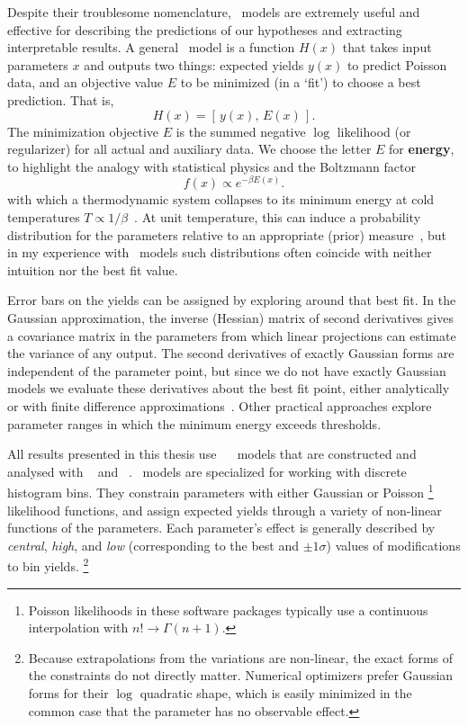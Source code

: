 Despite their troublesome nomenclature, \heplikelihood\ models are extremely
useful and effective for describing the predictions of our hypotheses and
extracting interpretable results.
A general \heplikelihood\ model is a function $H(x)$ that takes input
parameters $x$ and outputs two things:
expected yields $y(x)$ to predict Poisson data,
and an objective value $E$ to be minimized (in a `fit') to choose a best
prediction.
That is,
\begin{equation}
H(x) = [\,y(x), \,E(x)\,]
.
\end{equation}
The minimization objective $E$ is the summed negative $\log$ likelihood
(or regularizer) for all actual and auxiliary data.
We choose the letter $E$ for \textbf{energy}, to highlight the analogy with
statistical physics and the Boltzmann factor
\begin{equation}
f(x) \propto e^{-\beta E(x)}
.
\end{equation}
with which a thermodynamic system collapses to its minimum energy at cold
temperatures $T \propto 1/\beta$~\cite{
skilling2017david,
lecun-06,
pmlr-v2-ranzato07a
}.
At unit temperature, this can induce a probability distribution
for the parameters relative to an appropriate (prior)
measure~\cite{cranmer2012histfactory, skilling2017david},
but in my experience with \heplikelihood\ models such distributions often
coincide with neither intuition nor the best fit value.

Error bars on the yields can be assigned by exploring around that best fit.
In the Gaussian approximation, the inverse (Hessian) matrix of second
derivatives gives a covariance matrix in the parameters from which linear
projections can estimate the variance of any output.
The second derivatives of exactly Gaussian forms are independent of the
parameter point, but since we do not have exactly Gaussian models we evaluate
these derivatives about the best fit point, either analytically or with finite
difference approximations~\cite{cranmer2021building}.
Other practical approaches explore parameter ranges in which the minimum energy
exceeds thresholds.

All results presented in this thesis use
\histfactory~\cite{cranmer2012histfactory} \heplikelihood\ models that are
constructed and analysed with
\histfitter~\cite{Besjes_2015,baak2015histfitter}
and \pyhf~\cite{heinrich2021pyhf}.
\histfactory\ models are specialized for working with discrete histogram bins.
They constrain parameters with either Gaussian or Poisson%
\footnote{%
Poisson likelihoods in these software packages typically use a continuous
interpolation with $n! \to \Gamma(n + 1)$.%
}
likelihood
functions, and assign expected yields through a variety of
non-linear functions of the parameters.
Each parameter's effect is generally described by
\emph{central}, \emph{high}, and \emph{low}
(corresponding to the best and $\pm1\sigma$)
values of modifications to bin yields.%
\footnote{%
Because extrapolations from the variations are non-linear, the exact forms of
the constraints do not directly matter.
Numerical optimizers prefer Gaussian forms for their $\log$ quadratic shape, which is
easily minimized in the common case that the parameter has no observable
effect.%
}

